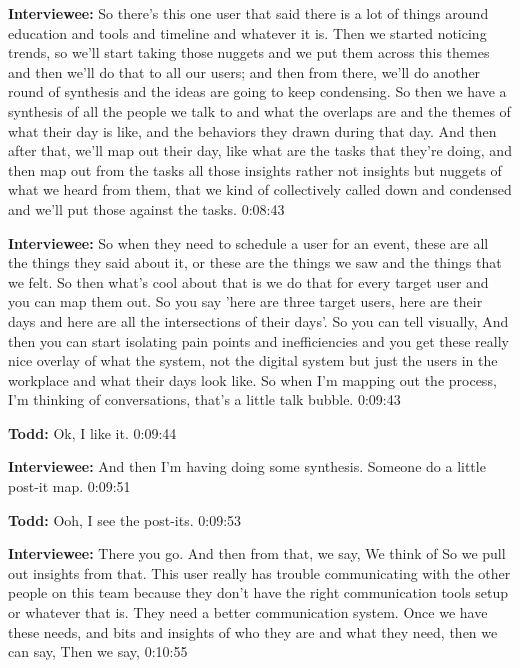\textbf{Interviewee:} So there's this one user that said there is a lot of things around education and tools and timeline and whatever it is.  Then we started noticing trends, so we'll start taking those nuggets and we put them across this themes and then we'll do that to all our users; and then from there, we'll do another round of synthesis and the ideas are going to keep condensing.  So then we have a synthesis of all the people we talk to and what the overlaps are and the themes of what their day is like, and the behaviors they drawn during that day.  And then after that, we'll map out their day, like what are the tasks that they're doing, and then map out from the tasks all those insights rather not insights but nuggets of what we heard from them, that we kind of collectively called down and condensed and we'll put those against the tasks.    0:08:43

\textbf{Interviewee:} So when they need to schedule a user for an event, these are all the things they said about it, or these are the things we saw and the things that we felt.  So then what's cool about that is we do that for every target user and you can map them out.  So you say 'here are three target users, here are their days and here are all the intersections of their days'.   So you can tell visually,  And then you can start isolating pain points and inefficiencies and you get these really nice overlay of what the system, not the digital system but just the users in the workplace and what their days look like.  So when I'm mapping out the process, I'm thinking of conversations, that's a little talk bubble.  0:09:43

\textbf{Todd:} Ok, I like it.  0:09:44

\textbf{Interviewee:} And then I'm having doing some synthesis. Someone do a little post-it map.  0:09:51

\textbf{Todd:} Ooh, I see the post-its.  0:09:53

\textbf{Interviewee:} There you go.  And then from that, we say,   We think of  So we pull out insights from that. This user really has trouble communicating with the other people on this team because they don't have the right communication tools setup or whatever that is. They need a better communication system.  Once we have these needs, and bits and insights of who they are and what they need, then we can say,  Then we say,    0:10:55

